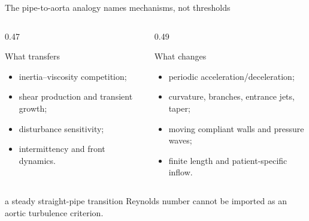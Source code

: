 \documentclass[aspectratio=169,11pt]{beamer}
\begin{document}
\begin{frame}{The pipe-to-aorta analogy names mechanisms, not thresholds}
\begin{columns}[T,onlytextwidth]
\begin{column}{0.47\textwidth}
\begin{block}{What transfers}
\begin{itemize}\itemsep3pt
  \item inertia--viscosity competition;
  \item shear production and transient growth;
  \item disturbance sensitivity;
  \item intermittency and front dynamics.
\end{itemize}
\end{block}
\end{column}
\begin{column}{0.49\textwidth}
\begin{alertblock}{What changes}
\begin{itemize}\itemsep3pt
  \item periodic acceleration/deceleration;
  \item curvature, branches, entrance jets, taper;
  \item moving compliant walls and pressure waves;
  \item finite length and patient-specific inflow.
\end{itemize}
\end{alertblock}
\end{column}
\end{columns}

\vspace{0.45em}
 a steady straight-pipe transition Reynolds number cannot be imported as an aortic turbulence criterion.
\end{frame}
\end{document}
